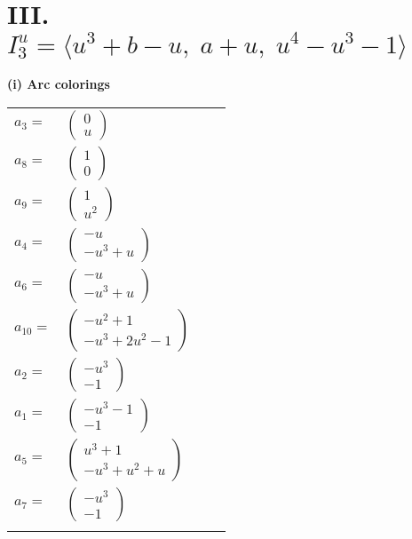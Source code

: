 \documentclass[1p]{elsarticle_modified}
\theoremstyle{definition}
\begin{document}
\centering \section*{III. $I^u_{3}= \langle u^3+b- u,\;a+u,\;u^4- u^3-1 \rangle$}
\flushleft \textbf{(i) Arc colorings}\\
\begin{tabular}{m{7pt} m{180pt} m{7pt} m{180pt} }
\flushright $a_{3}=$&$\begin{pmatrix}0\\u\end{pmatrix}$ \\
\flushright $a_{8}=$&$\begin{pmatrix}1\\0\end{pmatrix}$ \\
\flushright $a_{9}=$&$\begin{pmatrix}1\\u^2\end{pmatrix}$ \\
\flushright $a_{4}=$&$\begin{pmatrix}- u\\- u^3+u\end{pmatrix}$ \\
\flushright $a_{6}=$&$\begin{pmatrix}- u\\- u^3+u\end{pmatrix}$ \\
\flushright $a_{10}=$&$\begin{pmatrix}- u^2+1\\- u^3+2 u^2-1\end{pmatrix}$ \\
\flushright $a_{2}=$&$\begin{pmatrix}- u^3\\-1\end{pmatrix}$ \\
\flushright $a_{1}=$&$\begin{pmatrix}- u^3-1\\-1\end{pmatrix}$ \\
\flushright $a_{5}=$&$\begin{pmatrix}u^3+1\\- u^3+u^2+u\end{pmatrix}$ \\
\flushright $a_{7}=$&$\begin{pmatrix}- u^3\\-1\end{pmatrix}$\\&\end{tabular}
\end{document}
